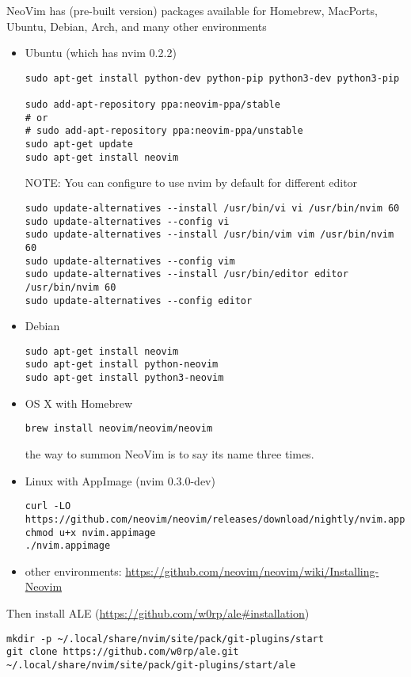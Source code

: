NeoVim has (pre-built version) packages available for Homebrew, MacPorts,
Ubuntu, Debian, Arch, and many other environments
\begin{itemize}
  \item Ubuntu (which has nvim 0.2.2)
  
  
\begin{verbatim}
sudo apt-get install python-dev python-pip python3-dev python3-pip

sudo add-apt-repository ppa:neovim-ppa/stable
# or 
# sudo add-apt-repository ppa:neovim-ppa/unstable
sudo apt-get update
sudo apt-get install neovim
\end{verbatim}

NOTE: You can configure to use nvim by default for different editor
\begin{verbatim}
sudo update-alternatives --install /usr/bin/vi vi /usr/bin/nvim 60
sudo update-alternatives --config vi
sudo update-alternatives --install /usr/bin/vim vim /usr/bin/nvim 60
sudo update-alternatives --config vim
sudo update-alternatives --install /usr/bin/editor editor /usr/bin/nvim 60
sudo update-alternatives --config editor
\end{verbatim}

  \item Debian
  
\begin{verbatim}
sudo apt-get install neovim
sudo apt-get install python-neovim
sudo apt-get install python3-neovim
\end{verbatim}


  \item  OS X with Homebrew
  
\begin{verbatim}
brew install neovim/neovim/neovim
\end{verbatim}
the way to summon NeoVim is to say its name three times.

  \item Linux with AppImage  (nvim 0.3.0-dev)
\begin{verbatim}
curl -LO https://github.com/neovim/neovim/releases/download/nightly/nvim.appimage
chmod u+x nvim.appimage
./nvim.appimage
\end{verbatim}


  \item  other environments:
  \url{https://github.com/neovim/neovim/wiki/Installing-Neovim}
\end{itemize}

Then install ALE (\url{https://github.com/w0rp/ale#installation})
\begin{verbatim}
mkdir -p ~/.local/share/nvim/site/pack/git-plugins/start
git clone https://github.com/w0rp/ale.git ~/.local/share/nvim/site/pack/git-plugins/start/ale
\end{verbatim}

